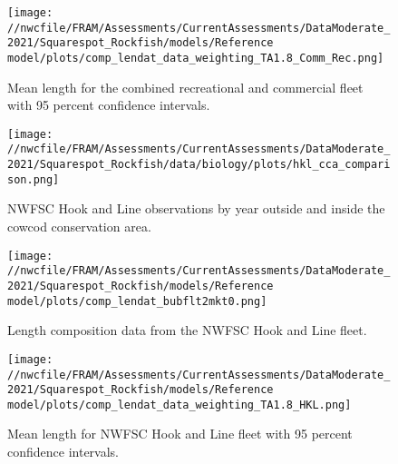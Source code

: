 \documentclass[11pt,
  english,
  a4paper,
]{article}
\begin{document}
\begin{figure}
\centering
\texttt{[image: //nwcfile/FRAM/Assessments/CurrentAssessments/DataModerate\_2021/Squarespot\_Rockfish/models/Reference model/plots/comp\_lendat\_data\_weighting\_TA1.8\_Comm\_Rec.png]}
\caption{Mean length for the combined recreational and commercial fleet with 95 percent confidence intervals.\label{fig:rec-com-mean-len-data}}
\end{figure}

\tagmcend\tagstructend


\begin{figure}
\centering
\texttt{[image: //nwcfile/FRAM/Assessments/CurrentAssessments/DataModerate\_2021/Squarespot\_Rockfish/data/biology/plots/hkl\_cca\_comparison.png]}
\caption{NWFSC Hook and Line observations by year outside and inside the cowcod conservation area.\label{fig:hkl-cca}}
\end{figure}

\tagmcend\tagstructend


\begin{figure}
\centering
\texttt{[image: //nwcfile/FRAM/Assessments/CurrentAssessments/DataModerate\_2021/Squarespot\_Rockfish/models/Reference model/plots/comp\_lendat\_bubflt2mkt0.png]}
\caption{Length composition data from the NWFSC Hook and Line fleet.\label{fig:hkl-len-data}}
\end{figure}

\tagmcend\tagstructend


\begin{figure}
\centering
\texttt{[image: //nwcfile/FRAM/Assessments/CurrentAssessments/DataModerate\_2021/Squarespot\_Rockfish/models/Reference model/plots/comp\_lendat\_data\_weighting\_TA1.8\_HKL.png]}
\caption{Mean length for NWFSC Hook and Line fleet with 95 percent confidence intervals.\label{fig:mean-hkl-len-data}}
\end{figure}
\end{document}
